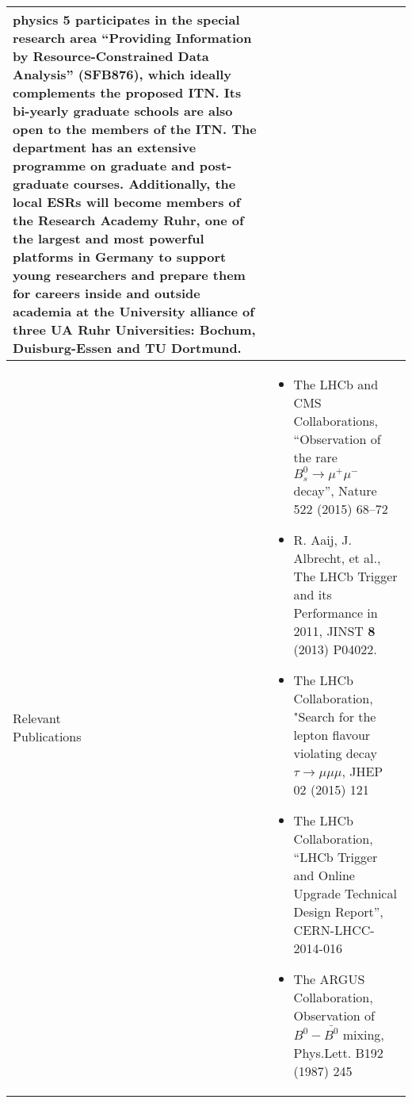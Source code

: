 \begin{center}
{\begin{tabular}{@{}p{25mm}|p{190mm}@{}}
{physics 5 participates in the special research area “Providing
Information by Resource-Constrained Data Analysis” (SFB876), which
ideally complements the proposed ITN. Its bi-yearly graduate schools
are also open to the members of the ITN. The department has an
extensive programme on graduate and post-graduate courses. 
Additionally, the local ESRs will become members of the
\textbf{Research Academy Ruhr}, one of the largest and most powerful
platforms in Germany to support young researchers and prepare them for
careers inside and outside academia at the University alliance of three
UA Ruhr Universities: Bochum, Duisburg-Essen and TU Dortmund.   
} \tabularnewline\hline\Tstrut
\pbox{8cm}{\Tstrut Relevant\\Publications} &%
{\vspace{-3mm}
\begin{itemize}%
 \item The LHCb and CMS Collaborations, “Observation of the rare
   $B^0_s \rightarrow \mu^+ \mu^-$ decay”, Nature 522 (2015) 68–72
 \item R. Aaij, J. Albrecht, et al., The LHCb Trigger and its Performance in 2011, JINST {\bf 8} (2013) P04022. 
\item  The LHCb Collaboration, "Search for the lepton flavour
  violating decay $\tau\to\mu\mu\mu$, JHEP 02 (2015) 121
 \item The LHCb Collaboration, ``LHCb Trigger and Online Upgrade Technical Design Report'', CERN-LHCC-2014-016
 \item The ARGUS Collaboration, Observation of $B^0-\bar{B^0}$ mixing, Phys.Lett. B192 (1987) 245
\end{itemize}
}\tabularnewline\hline

\end{tabular}
}%
\end{center}

